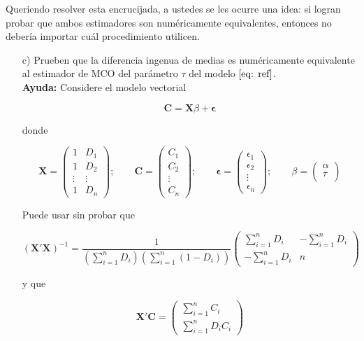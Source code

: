\documentclass[a4paper]{article}
\begin{document}
Queriendo resolver esta encrucijada, a ustedes se les ocurre una idea: si logran probar que ambos estimadores son numéricamente equivalentes, entonces no debería importar cuál procedimiento utilicen.

\begin{itemize}

\item[c)] Prueben que la diferencia ingenua de medias es numéricamente equivalente al estimador de MCO del parámetro $\tau$ del modelo $\eqref{eq: ref}$. \\

\textbf{Ayuda:} Considere el modelo vectorial

  
    $$\boldsymbol{C}=\boldsymbol{X}\beta +\boldsymbol{\epsilon}$$
    
    donde
    
    \[
    \boldsymbol{X}=
    \begin{pmatrix}
    1 & D_1 \\
    1 & D_2 \\
    \vdots & \vdots\\
    1 & D_n
    \end{pmatrix}; \qquad
    \boldsymbol{C}=
    \begin{pmatrix}
    C_1\\
    C_2 \\
    \vdots\\
    C_n
    \end{pmatrix};\qquad
    \boldsymbol{\epsilon}=
    \begin{pmatrix}
    \epsilon_1\\
    \epsilon_2 \\
    \vdots\\
    \epsilon_n
    \end{pmatrix}; \qquad
    \beta=
    \begin{pmatrix}
    \alpha\\
    \tau \\
    \end{pmatrix}
    \]
    


Puede usar sin probar que

 \[
    (\boldsymbol{X}'\boldsymbol{X})^{-1}=
    \dfrac{1}{\left( \sum \limits_{i=1}^n D_i \right) \left(\sum\limits_{i=1}^n (1-D_i) \right)}
    \begin{pmatrix}
    \sum \limits_{i=1}^n D_i & -\sum \limits_{i=1}^n D_i\\
    -\sum \limits_{i=1}^n D_i & n 
    \end{pmatrix}
    \]


y que 


    \[\boldsymbol{X}'\boldsymbol{C}=
  \begin{pmatrix}
    \sum \limits_{i=1}^n C_i\\
    \sum \limits_{i=1}^n D_iC_i
    \end{pmatrix}
    \]\\
    
\end{itemize}
\end{document}
